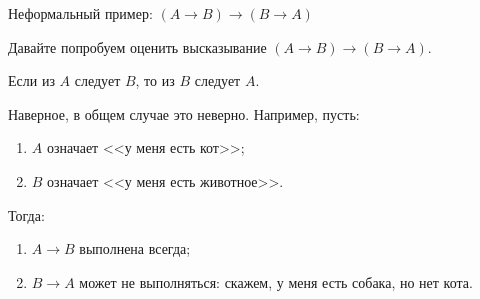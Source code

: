 \documentclass[aspectratio=169]{beamer}
\begin{document}
\begin{frame}{Неформальный пример: $(A \rightarrow B) \rightarrow (B \rightarrow A)$}

Давайте попробуем оценить высказывание $(A \rightarrow B) \rightarrow (B \rightarrow A)$.\pause

\vspace{0.5cm}

Если из $A$ следует $B$, то из $B$ следует $A$.\pause

\vspace{0.5cm}

Наверное, в общем случае это неверно. Например, пусть:

\begin{enumerate}
\item $A$ означает <<у меня есть кот>>;\pause
\item $B$ означает <<у меня есть животное>>.
\end{enumerate}\pause

\vspace{0.5cm}
Тогда:
\begin{enumerate}
\item $A \rightarrow B$ выполнена всегда;\pause
\item $B \rightarrow A$ может не выполняться: скажем, у меня есть собака, но нет кота.
\end{enumerate}

\end{frame}
\end{document}
